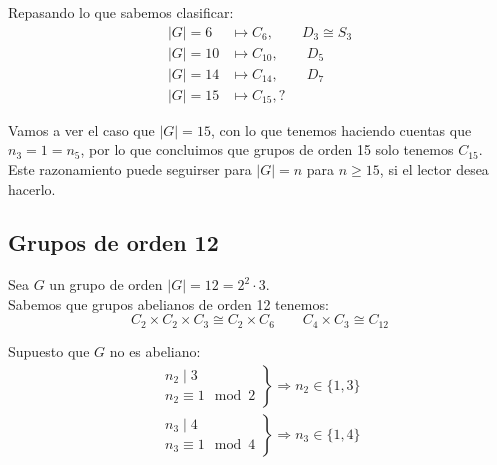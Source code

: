 \noindent
Repasando lo que sabemos clasificar:
\begin{align*}
    |G| = 6 &\longmapsto C_6, \qquad D_3\cong S_3 \\
    |G| = 10 &\longmapsto C_{10}, \qquad D_5 \\
    |G| = 14 &\longmapsto C_{14}, \qquad D_7 \\
    |G| = 15 &\longmapsto C_{15}, ?
\end{align*}

Vamos a ver el caso que $|G| = 15$, con lo que tenemos haciendo cuentas que $n_3 = 1 = n_5$, por lo que concluimos que grupos de orden 15 solo tenemos $C_{15}$. Este razonamiento puede seguirser para $|G| = n$ para $n\geq 15$, si el lector desea hacerlo.

\subsection{Grupos de orden 12}
Sea $G$ un grupo de orden $|G| = 12 = 2^2 \cdot 3$.\\

\noindent
Sabemos que grupos abelianos de orden 12 tenemos:
\begin{equation*}
    C_2\times C_2\times C_3 \cong C_2\times C_6 \qquad C_4\times C_3 \cong C_{12}
\end{equation*}

\noindent
Supuesto que $G$ no es abeliano:
\begin{gather*}
    \left.\begin{array}{r}
            n_2 \mid 3 \\
            n_2 \equiv 1 \mod 2
    \end{array}\right\} \Longrightarrow n_2 \in \{1,3\} \\
    \left.\begin{array}{r}
        n_3 \mid 4 \\
        n_3 \equiv 1 \mod 4
    \end{array}\right\} \Longrightarrow n_3 \in \{1,4\}
\end{gather*}

